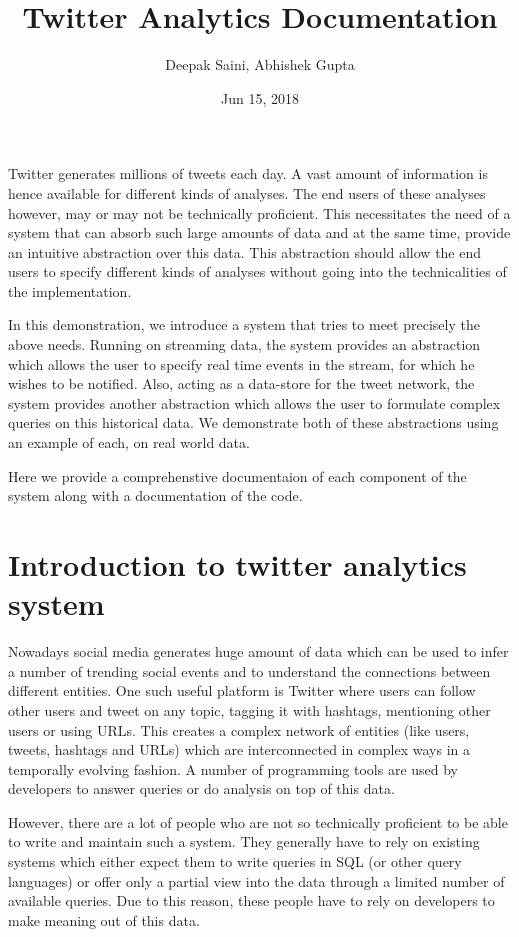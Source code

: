 \documentclass[letterpaper,10pt,english]{sphinxmanual}
\title{Twitter Analytics Documentation}
\date{Jun 15, 2018}
\author{Deepak Saini, Abhishek Gupta}
\begin{document}
\maketitle
\sphinxtableofcontents
{}\label{\detokenize{index::doc}}


Twitter generates millions of tweets each day. A vast amount of information is hence available for different kinds of analyses. The end users of these analyses however, may or may not be technically proficient. This necessitates the need of a system that can absorb such large amounts of data and at the same time, provide an intuitive abstraction over this data. This abstraction should allow the end users to specify different kinds of analyses without going into the technicalities of the implementation.

In this demonstration, we introduce a system that tries to meet precisely the above needs. Running on streaming data, the system provides an abstraction which allows the user to specify real time events in the stream, for which he wishes to be notified. Also, acting as a data-store for the tweet network, the system provides another abstraction which allows the user to formulate complex queries on this historical data. We demonstrate both of these abstractions using an example of each, on real world data.

Here we provide a comprehenstive documentaion of each component of the system along with a documentation of the code.


\chapter{Introduction to twitter analytics system}
\label{\detokenize{introduction:introduction-to-twitter-analytics-system}}\label{\detokenize{introduction::doc}}
Nowadays social media generates huge amount of data which can be used to infer a number of trending social events and to understand the connections between different entities. One such useful platform is Twitter where users can follow other users and tweet on any topic, tagging it with hashtags, mentioning other users or using URLs. This creates a complex network of entities (like users, tweets, hashtags and URLs) which are interconnected in complex ways in a temporally evolving fashion.  A number of programming tools are used by developers to answer queries or do analysis on top of this data.

However, there are a lot of people who are not so technically proficient to be able to write and maintain such a system. They generally have to rely on existing systems which either expect them to write queries in SQL (or other query languages) or offer only a partial view into the data through a limited number of available queries. Due to this reason, these people have to rely on developers to make meaning out of this data.
\end{document}
